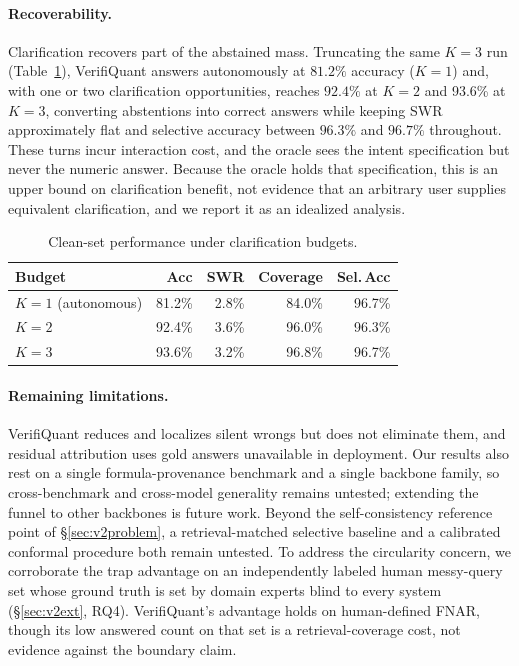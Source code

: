 \documentclass[sigconf,anonymous]{acmart}
\newcommand{\vqAccAll}{93.6\%}
\newcommand{\vqCovAll}{96.8\%}
\newcommand{\vqSelAccAll}{96.7\%}
\newcommand{\vqSWRAll}{3.2\%}
\begin{document}
\paragraph{Recoverability.}
Clarification recovers part of the abstained mass. Truncating the same $K{=}3$ run (Table~\ref{tab:v2kabl}), VerifiQuant answers autonomously at $81.2\%$ accuracy ($K{=}1$) and, with one or two clarification opportunities, reaches $92.4\%$ at $K{=}2$ and \vqAccAll{} at $K{=}3$, converting abstentions into correct answers while keeping SWR approximately flat and selective accuracy between $96.3\%$ and $96.7\%$ throughout. These turns incur interaction cost, and the oracle sees the intent specification but never the numeric answer. Because the oracle holds that specification, this is an upper bound on clarification benefit, not evidence that an arbitrary user supplies equivalent clarification, and we report it as an idealized analysis.

\begin{table}[t]
\caption{Clean-set performance under clarification budgets.}
\label{tab:v2kabl}
\small
\begin{tabular}{@{}lrrrr@{}}
\toprule
Budget & Acc & SWR & Coverage & Sel.\,Acc \\
\midrule
$K{=}1$ (autonomous) & 81.2\% & 2.8\% & 84.0\% & 96.7\% \\
$K{=}2$ & 92.4\% & 3.6\% & 96.0\% & 96.3\% \\
$K{=}3$ & \vqAccAll{} & \vqSWRAll{} & \vqCovAll{} & \vqSelAccAll{} \\
\bottomrule
\end{tabular}
\end{table}

\paragraph{Remaining limitations.}
VerifiQuant reduces and localizes silent wrongs but does not eliminate them, and residual attribution uses gold answers unavailable in deployment.
Our results also rest on a single formula-provenance benchmark and a single backbone family, so cross-benchmark and cross-model generality remains untested; extending the funnel to other backbones is future work.
Beyond the self-consistency reference point of \S\ref{sec:v2problem}, a retrieval-matched selective baseline and a calibrated conformal procedure both remain untested.
To address the circularity concern, we corroborate the trap advantage on an independently labeled human messy-query set whose ground truth is set by domain experts blind to every system (\S\ref{sec:v2ext}, RQ4). VerifiQuant's advantage holds on human-defined FNAR, though its low answered count on that set is a retrieval-coverage cost, not evidence against the boundary claim.
\end{document}
